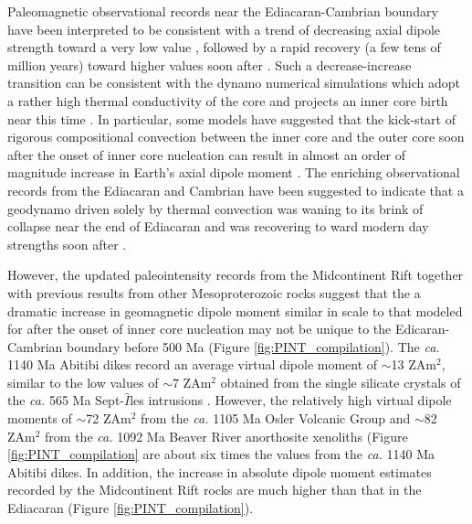 \documentclass[draft]{agujournal2019}
\begin{document}
Paleomagnetic observational records near the Ediacaran-Cambrian boundary have been interpreted to be consistent with a trend of decreasing axial dipole strength toward a very low value \cite{Lloyd2021a, Bono2019a}, followed by a rapid recovery (a few tens of million years) toward higher values soon after \cite{Thallner2021a}. Such a decrease-increase transition can be consistent with the dynamo numerical simulations which adopt a rather high thermal conductivity of the core and projects an inner core birth near this time \cite{Gomi2013a, Davies2015a, Labrosse2015a, Ohta2016a}. In particular, some models have suggested that the kick-start of rigorous compositional convection between the inner core and the outer core soon after the onset of inner core nucleation can result in almost an order of magnitude increase in Earth's axial dipole moment \cite[e.g.]{Davies2021a}. The enriching observational records from the Ediacaran and Cambrian have been suggested to indicate that a geodynamo driven solely by thermal convection was waning to its brink of collapse near the end of Ediacaran \cite{Bono2019a, Thallner2021b} and was recovering to ward modern day strengths soon after \cite{Thallner2021a}.

However, the updated paleointensity records from the Midcontinent Rift together with previous results from other Mesoproterozoic rocks suggest that the a dramatic increase in geomagnetic dipole moment similar in scale to that modeled for after the onset of inner core nucleation may not be unique to the Edicaran-Cambrian boundary before 500 Ma (Figure \ref{fig:PINT_compilation}). The \textit{ca.} 1140 Ma Abitibi dikes \cite{Macouin2003a} record an average virtual dipole moment of $\sim$13 ZAm$^2$, similar to the low values of $\sim$7 ZAm$^2$ obtained from the single silicate crystals of the \textit{ca.} 565 Ma Sept-$\hat{I}$les intrusions \cite{Bono2019a}. However, the relatively high virtual dipole moments of $\sim$72 ZAm$^2$ from the \textit{ca.} 1105 Ma Osler Volcanic Group \cite{Sprain2018a} and $\sim$82 ZAm$^2$ from the \textit{ca.} 1092 Ma Beaver River anorthosite xenoliths (Figure \ref{fig:PINT_compilation} are about six times the values from the \textit{ca.} 1140 Ma Abitibi dikes. In addition, the increase in absolute dipole moment estimates recorded by the Midcontinent Rift rocks are much higher than that in the Ediacaran (Figure \ref{fig:PINT_compilation}). 
\end{document}
